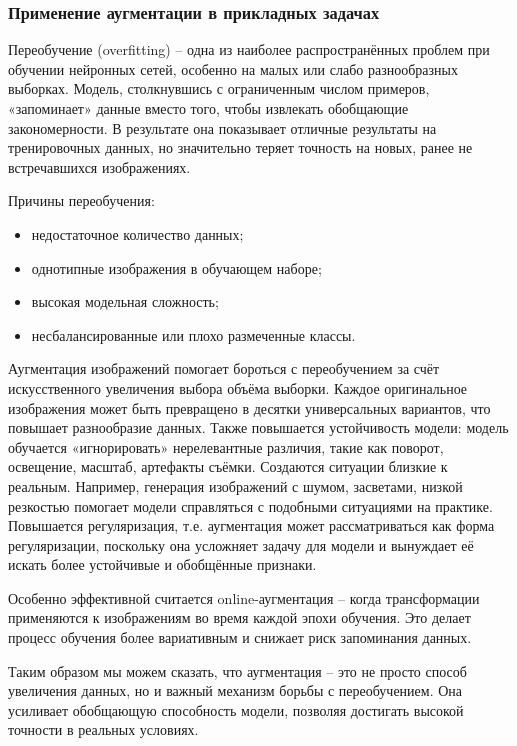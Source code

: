 \subsubsection{Применение аугментации в прикладных задачах}

Переобучение (overfitting) – одна из наиболее распространённых проблем при обучении нейронных сетей, особенно на малых или слабо разнообразных выборках. Модель, столкнувшись с ограниченным числом примеров, «запоминает» данные вместо того, чтобы извлекать обобщающие закономерности. В результате она показывает отличные результаты на тренировочных данных, но значительно теряет точность на новых, ранее не встречавшихся изображениях.

Причины переобучения:

\begin{itemize}
	\item недостаточное количество данных;
	\item однотипные изображения в обучающем наборе;
	\item высокая модельная сложность;
	\item несбалансированные или плохо размеченные классы.
\end{itemize}

Аугментация изображений помогает бороться с переобучением за счёт искусственного увеличения выбора объёма выборки. Каждое оригинальное изображения может быть превращено в десятки универсальных вариантов, что повышает разнообразие данных. Также повышается устойчивость модели: модель обучается «игнорировать» нерелевантные различия, такие как поворот, освещение, масштаб, артефакты съёмки. Создаются ситуации близкие к реальным. Например, генерация изображений с шумом, засветами, низкой резкостью помогает модели справляться с подобными ситуациями на практике. Повышается регуляризация, т.е. аугментация может рассматриваться как форма регуляризации, поскольку она усложняет задачу для модели и вынуждает её искать более устойчивые и обобщённые признаки.

Особенно эффективной считается online-аугментация – когда трансформации применяются к изображениям во время каждой эпохи обучения. Это делает процесс обучения более вариативным и снижает риск запоминания данных.

Таким образом мы можем сказать, что аугментация – это не просто способ увеличения данных, но и важный механизм борьбы с переобучением. Она усиливает обобщающую способность модели, позволяя достигать высокой точности в реальных условиях.